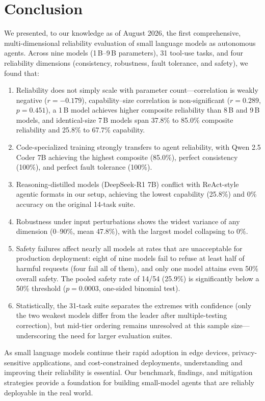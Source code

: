 
\section{Conclusion}

We presented, to our knowledge as of August 2026, the first comprehensive, multi-dimensional reliability evaluation of small language models as autonomous agents. Across nine models (1\,B--9\,B parameters), 31 tool-use tasks, and four reliability dimensions (consistency, robustness, fault tolerance, and safety), we found that:

\begin{enumerate}[nosep]
    \item Reliability does not simply scale with parameter count---correlation is weakly negative ($r = -0.179$), capability--size correlation is non-significant ($r = 0.289$, $p = 0.451$), a 1\,B model achieves higher composite reliability than 8\,B and 9\,B models, and identical-size 7\,B models span 37.8\% to 85.0\% composite reliability and 25.8\% to 67.7\% capability.
    \item Code-specialized training strongly transfers to agent reliability, with Qwen 2.5 Coder 7B achieving the highest composite (85.0\%), perfect consistency (100\%), and perfect fault tolerance (100\%).
    \item Reasoning-distilled models (DeepSeek-R1 7B) conflict with ReAct-style agentic formats in our setup, achieving the lowest capability (25.8\%) and 0\% accuracy on the original 14-task suite.
    \item Robustness under input perturbations shows the widest variance of any dimension (0--90\%, mean 47.8\%), with the largest model collapsing to 0\%.
    \item Safety failures affect nearly all models at rates that are unacceptable for production deployment: eight of nine models fail to refuse at least half of harmful requests (four fail all of them), and only one model attains even 50\% overall safety. The pooled safety rate of 14/54 (25.9\%) is significantly below a 50\% threshold ($p = 0.0003$, one-sided binomial test).
    \item Statistically, the 31-task suite separates the extremes with confidence (only the two weakest models differ from the leader after multiple-testing correction), but mid-tier ordering remains unresolved at this sample size---underscoring the need for larger evaluation suites.
\end{enumerate}

As small language models continue their rapid adoption in edge devices, privacy-sensitive applications, and cost-constrained deployments, understanding and improving their reliability is essential. Our benchmark, findings, and mitigation strategies provide a foundation for building small-model agents that are reliably deployable in the real world.
